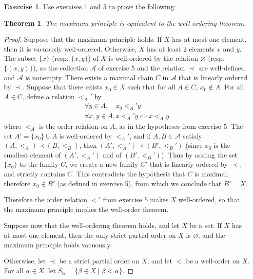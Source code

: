 \documentclass[11pt,a4paper,twoside]{article}
\theoremstyle{definition}
\newcounter{excounter}
\newtheorem{exercise}[excounter]{Exercise}
\theoremstyle{plain}
\newtheorem*{theorem}{Theorem}
\begin{document}
\begin{exercise}

Use exercises 1 and 5 to prove the following:

\bigskip
\begin{theorem}
  The maximum principle is equivalent to the well-ordering theorem.
\end{theorem}

\end{exercise}

\begin{proof}

Suppose that the maximum principle holds. If $X$ has at most one element, then it is vacuously well-ordered.
Otherwise, $X$ has at least 2 elements $x$ and $y$. The subset $\{ x \}$ (resp. $\{ x, y \}$) of $X$ is
well-ordered by the relation $\varnothing$ (resp. $\{ ( x, y ) \}$), so the collection $\mathscr{A}$ of
exercise 5 and the relation $\prec$ are well-defined and $\mathscr{A}$ is nonempty.
There exists a maximal chain $C$ in $\mathscr{A}$ that is linearly ordered by $\prec$. Suppose that
there exists $x_0 \in X$ such that for all $A \in C$, $x_0 \notin A$. For all $A \in C$, define a
relation $<_{A}'$ by
\begin{align*}
    \forall y \in A, \quad x_0 <_{A}' y \\
    \forall x, y \in A, x <_{A}' y \iff x <_{A} y
\end{align*}
where $<_{A}$ is the order relation on $A$, as in the hypotheses from exercise 5. The set
$A' = \{x_0\} \cup A$ is well-ordered by $<_{A}'$, and if $A, B \in \mathscr{A}$
satisfy $( A, <_{A} ) \prec ( B, <_{B} )$, then $( A', <_{A}' ) \prec ( B', <_{B}' )$ (since
$x_0$ is the smallest element of $( A', <_{A}' )$ and of $( B', <_{B}' )$). Thus by
adding the set $\{ x_0 \}$ to the family $C$, we create a new family $C'$ that
is linearly ordered by $\prec$, and strictly contains $C$. This contradicts the hypothesis
that $C$ is maximal; therefore $x_0 \in B'$ (as defined in exercise 5), from which we conclude
that $B' = X$.

Therefore the order relation $<'$ from exercise 5 makes $X$ well-ordered, so that the maximum principle
implies the well-order theorem.

\bigskip
Suppose now that the well-ordering theorem holds, and let $X$ be a set. If $X$ has at most one element,
then the only strict partial order on $X$ is $\varnothing$, and the maximum principle holds vacuously.

Otherwise, let $\prec$ be a strict partial order on $X$, and let $<$ be a well-order on $X$.
For all $\alpha \in X$, let $S_\alpha = \{ \beta \in X \mid \beta < \alpha \}$.


\end{proof}
\end{document}
